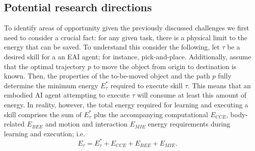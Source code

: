 \subsection{Potential research directions}
To identify areas of opportunity given the previously discussed challenges we first need to consider a crucial fact: for any given task, there is a physical limit to the energy that can be saved. To understand this consider the following, let $\tau$ be a desired skill for a an EAI agent; for instance, pick-and-place. Additionally, assume that the optimal trajectory $p$ to move the object from origin to destination is known. Then, the properties of the to-be-moved object and the path $p$ fully determine the minimum energy $E^*_{\tau}$ required to execute skill $\tau$. This means that an embodied AI agent attempting to execute $\tau$ will consume at least this amount of energy. In reality, however, the total energy required for learning and executing a skill comprises the sum of $E^*_{\tau}$ plus the accompanying computational $E_{CCE}$, body-related $E_{BEE}$ and motion and interaction $E_{MIE}$ energy requirements during learning and execution; i.e.
\begin{equation}
     E_{\tau} =  E^*_{\tau} +  E_{CCE} +  E_{BEE} +  E_{MIE}.
\end{equation}
